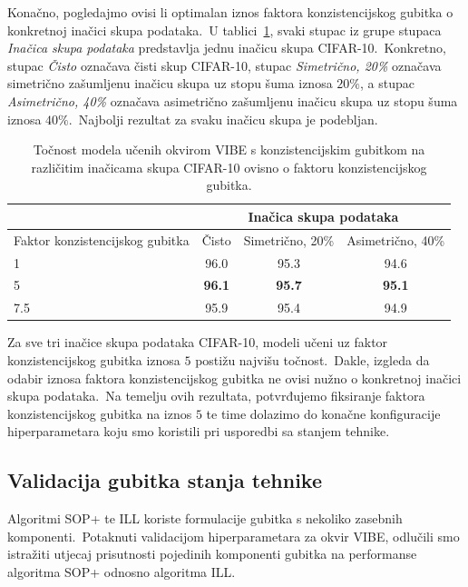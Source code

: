 \documentclass[diplomskirad]{fer}
\begin{document}
Konačno, pogledajmo ovisi li optimalan iznos faktora konzistencijskog gubitka o konkretnoj inačici skupa podataka.\ U tablici~\ref{tbl:usporedba_con_rate_razl_skupovi}, svaki stupac iz grupe stupaca \textit{Inačica skupa podataka} predstavlja jednu inačicu skupa CIFAR-10.\ 
Konkretno, stupac \textit{Čisto} označava čisti skup CIFAR-10, stupac \textit{Simetrično, 20\%} označava simetrično zašumljenu inačicu skupa uz stopu šuma iznosa $20\%$, a stupac \textit{Asimetrično, 40\%} označava asimetrično zašumljenu inačicu skupa uz stopu šuma iznosa $40\%$.\ 
Najbolji rezultat za svaku inačicu skupa je podebljan.\ 

\begin{table}[htb]
  \caption{Točnost modela učenih okvirom VIBE s konzistencijskim gubitkom na različitim inačicama skupa CIFAR-10 ovisno o faktoru konzistencijskog gubitka.}
  \label{tbl:usporedba_con_rate_razl_skupovi}
  \centering
  \begin{tabular}{l||ccc}
  & \multicolumn{3}{c}{Inačica skupa podataka} \\ \hline
  Faktor konzistencijskog gubitka & Čisto & Simetrično, 20\% & Asimetrično, 40\% \\ \hline \hline
  1 & 96.0 & 95.3 & 94.6 \\
  5 & \textbf{96.1} & \textbf{95.7} & \textbf{95.1} \\
  7.5 & 95.9 & 95.4 & 94.9 \\
  \end{tabular}
\end{table}

Za sve tri inačice skupa podataka CIFAR-10, modeli učeni uz faktor konzistencijskog gubitka iznosa $5$ postižu najvišu točnost.\ 
Dakle, izgleda da odabir iznosa faktora konzistencijskog gubitka ne ovisi nužno o konkretnoj inačici skupa podataka.\ Na temelju ovih rezultata, potvrđujemo fiksiranje faktora konzistencijskog gubitka na iznos $5$ te time dolazimo do konačne konfiguracije hiperparametara koju smo koristili pri usporedbi sa stanjem tehnike.\ 

\subsection{Validacija gubitka stanja tehnike}
\label{sub:validacija_zasumljene_sota}

Algoritmi SOP+ te ILL koriste formulacije gubitka s nekoliko zasebnih komponenti.\ 
Potaknuti validacijom hiperparametara za okvir VIBE, odlučili smo istražiti utjecaj prisutnosti pojedinih komponenti gubitka na performanse algoritma SOP+ odnosno algoritma ILL.\ 
\end{document}
